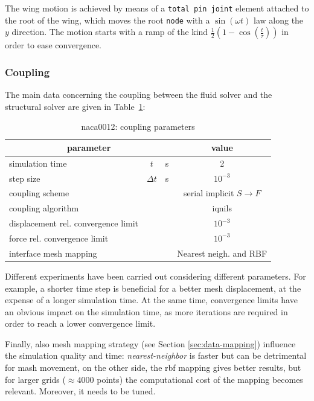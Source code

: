 The wing motion is achieved by means of a \texttt{total pin joint} element attached to the root of the wing, which moves the root \texttt{node} with a $\sin(\omega t)$ law along the $y$ direction. The motion starts with a ramp of the  kind $\frac{1}{2}\left(1-\cos\left(\frac{t}{\tau}\right)\right)$ in order to ease convergence.

\subsubsection{Coupling}

The main data concerning the coupling between the fluid solver and the structural solver  are given in Table~\ref{table:hc-coupling}:


\begin{table}[!htb]
	\begin{center}
		\begin{tabular}{ l c  l| c } 
			\multicolumn{3}{c|}{parameter} & value   \\ 
			\hline
			simulation time  & $t$& \si{s} & 2      \\
			step size & $\Delta t$ & \si{s} & $10^{-3}$   \\
			\hline
			coupling scheme & & & serial implicit  $S\rightarrow F$  \\
			coupling algorithm & & &  \acrshort{iqnils}  \\
			displacement rel. convergence limit & & & $10^{-3}$ \\
			force rel. convergence limit &&  & $10^{-3}$  \\
      		interface mesh mapping & & & Nearest neigh. and RBF  \\
			
		\end{tabular}
	\end{center}
	\caption{naca0012: coupling parameters}
	\label{table:hc-coupling}
\end{table}

Different experiments have been carried out considering different parameters. For example, a shorter time step is beneficial for a better mesh displacement, at the expense of a longer simulation time. At the same time, convergence limits have an obvious impact on the simulation time, as more iterations are required in order to reach a lower convergence limit.

Finally, also mesh mapping strategy (see Section \ref{sec:data-mapping}) influence the simulation quality and time: \textit{nearest-neighbor} is faster but can be detrimental for mash movement, on the other side, the \acrfull{rbf} mapping gives better results, but for larger grids ($\approx4000$ points) the computational cost of the mapping becomes relevant. Moreover, it needs to be tuned.

